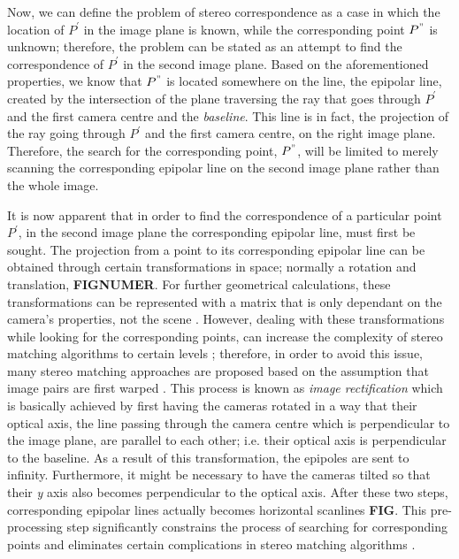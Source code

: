 \documentclass[12pt]{report}
\begin{document}
Now, we can define the problem of stereo correspondence as a case in which the location of $P^{'}$ in the image plane is known, while the
corresponding point $P^{"}$ is unknown; therefore, the problem can be stated as an attempt to find the correspondence of $P^{'}$ in the second image plane. Based on the aforementioned 
properties, we know that $P^{"}$ is located somewhere on the line, the epipolar line,
created by the intersection of the plane traversing the ray that goes through $P^{'}$ and the first camera centre and the {\it baseline}. This line is in fact, the projection of the ray going
through $P^{'}$ and the first camera centre, on the right image plane. Therefore, the search for the corresponding point, $P^{"}$, will be limited to merely scanning the corresponding 
epipolar line on the second image plane rather than the whole image.


It is now apparent that in order to find the correspondence of a particular point $P^{'}$, in the second image plane
the corresponding epipolar line, must first be sought. 
The projection from a point to its corresponding epipolar line can be obtained through certain transformations in space; normally a rotation and translation, \textbf {FIGNUMER}.
For further geometrical calculations, these transformations can be represented
with a matrix that is only dependant on the camera's properties, not the scene \cite{hart2000}.
However, dealing with these transformations while looking for the corresponding points, can increase the complexity of stereo matching algorithms to certain levels \cite{sze11}; therefore, 
in order to avoid this issue, many stereo matching approaches are proposed based on the assumption that image pairs are first warped \cite{sze11}.
This process is known as {\it image rectification} which is basically achieved by first having the cameras rotated in a way that their optical axis, 
the line passing through the camera centre which is perpendicular to the image plane, are parallel to each other; 
i.e. their optical axis is perpendicular to the baseline. As a result of this transformation, the epipoles are sent to infinity. 
Furthermore, it might be necessary to have the cameras tilted so that their {\it y} axis also becomes perpendicular to the optical axis. 
After these two steps, corresponding epipolar lines actually becomes horizontal scanlines \textbf{FIG}. This pre-processing step significantly constrains the process of searching 
for corresponding points and eliminates certain complications in stereo matching algorithms \cite{sze11}. \newline 
\end{document}
